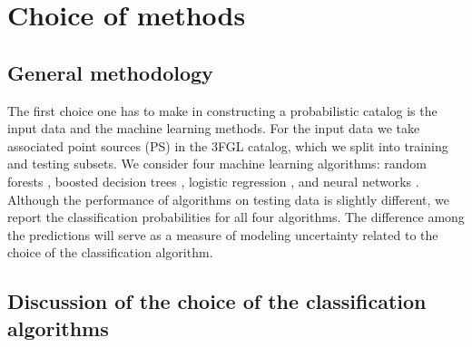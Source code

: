 \section{Choice of methods}

\subsection{General methodology}

The first choice one has to make in constructing a probabilistic catalog is the input data and the machine learning methods.
For the input data we take associated point sources (PS) in the 3FGL catalog, which we split into training and testing subsets.
We consider four machine learning algorithms: random forests \citep[RF,][]{709601, Breiman:2001hzm}, 
boosted decision trees \citep[BDT,][]{friedman2001},  
logistic regression \citep[LR,][]{cox1958}, 
and neural networks \citep[NN,][]{Hopfield:1982pe}.
Although the performance of algorithms on testing data is slightly different, 
we report the classification probabilities for all four algorithms.
The difference among the predictions will serve as a measure of modeling uncertainty related 
to the choice of the classification algorithm.

\subsection{Discussion of the choice of the classification algorithms}


